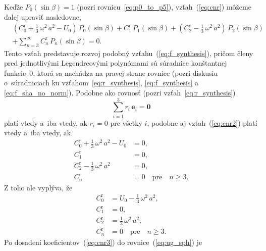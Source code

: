 \documentclass[a4paper, 12pt]{book}
\let\vec\mathbf
\begin{document}
Keďže $P_0(\sin\beta) = 1$ (pozri rovnicu~\ref{eq:p0_to_p5}), 
vzťah~(\ref{eq:cnr}) môžeme ďalej upraviť nasledovne,
%
\begin{equation}
\label{eq:cnr2}
\begin{split}
&\left( C_0^\mathrm{r} + \frac{1}{3} \, \omega^2 \, a^2 - U_0 \right) \, 
P_0(\sin\beta) + C_1^\mathrm{r} \, P_1(\sin\beta) + \left(C_2^\mathrm{r} 
- \frac{1}{3} \, \omega^2 \, a^2 \right) \, P_2(\sin\beta)\\
%
&+ \sum_{n = 3}^\infty C^{\mathrm{r}}_n \, P_n(\sin\beta) = 0{.}
\end{split}
\end{equation}
%
Tento vzťah predstavuje rozvoj podobný vzťahu~(\ref{eq:f_synthesis}), pričom 
členy pred jednotlivými Legendreovými polynómami sú súradnice konštantnej 
funkcie~0, ktorá sa nachádza na pravej strane rovnice (pozri diskusiu 
o~súradniciach ku vzťahom~\ref{eq:r_synthesis}, \ref{eq:f_synthesis} 
a \ref{eq:f_sha_no_norm}).  Podobne ako rovnosť (pozri 
vzťah~\ref{eq:r_synthesis})
%
\begin{equation}
\sum_{i = 1}^3 r_i \, \vec{e}_i = \vec{0}
\end{equation}
%
platí vtedy a~iba vtedy, ak $r_i = 0$ pre všetky $i$, podobne aj 
vzťah~(\ref{eq:cnr2}) platí vtedy a~iba vtedy, ak
%
\begin{equation}
\begin{split}
C_0^\mathrm{r} + \frac{1}{3} \, \omega^2 \, a^2 - U_0 &= 0{,}\\
C_1^\mathrm{r}                                        &= 0{,}\\
C_2^\mathrm{r} - \frac{1}{3} \, \omega^2 \, a^2       &= 0{,}\\
C_n^\mathrm{r}                                        &= 0 \quad \textrm{pre} 
\quad n \geq 3{.}
\end{split}
\end{equation}
%
Z toho ale vyplýva, že
%
\begin{equation}
\label{eq:cnr3}
\begin{split}
C_0^\mathrm{r} &= U_0 - \frac{1}{3} \, \omega^2 \, a^2{,}\\
C_1^\mathrm{r} &= 0{,}\\
C_2^\mathrm{r} &= \frac{1}{3} \, \omega^2 \, a^2{,}\\
C_n^\mathrm{r} &= 0 \quad \textrm{pre} \quad n \geq 3{.}
\end{split}
\end{equation}
%
Po dosadení koeficientov~(\ref{eq:cnr3}) do rovnice~(\ref{eq:ug_sph}) je 
\end{document}

